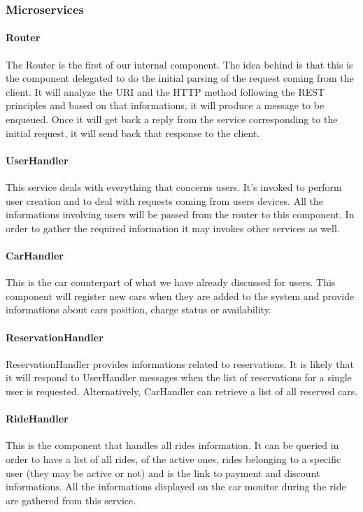 \pagebreak
\subsubsection{Microservices}
\paragraph{Router}
The Router is the first of our internal component. The idea behind is that this is the component
delegated to do the initial parsing of the request coming from the client. It will analyze
the URI and the HTTP method following the REST principles and based on that informations,
it will produce a message to be enqueued. Once it will get back a reply from the service
corresponding to the initial request, it will send back that response to the client.

\paragraph{UserHandler}
This service deals with everything that concerns users. It's invoked to perform user creation
and to deal with requests coming from users devices. All the informations involving users
will be passed from the router to this component. In order to gather the required information
it may invokes other services as well.

\paragraph{CarHandler}
This is the car counterpart of what we have already discussed for users. This component will
register new cars when they are added to the system and provide informations about cars
position, charge status or availability.

\paragraph{ReservationHandler}
ReservationHandler provides informations related to reservations. It is likely that it will
respond to UserHandler messages when the list of reservations for a single user is requested.
Alternatively, CarHandler can retrieve a list of all reserved cars. 

\paragraph{RideHandler}
This is the component that handles all rides information. It can be queried in order to have
a list of all rides, of the active ones, rides belonging to a specific user
(they may be active or not) and is the link to payment and discount informations. All the informations
displayed on the car monitor during the ride are gathered from this service.

